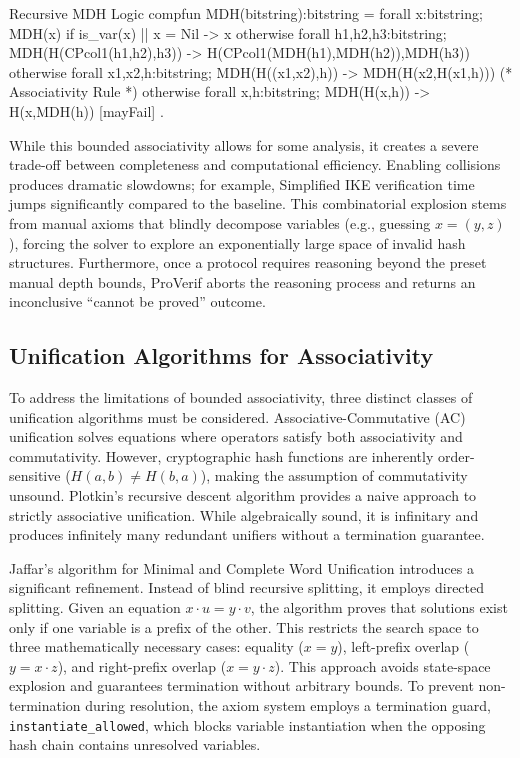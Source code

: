 \documentclass[journal]{IEEEtran}
\begin{document}
\begin{proverifcode}{Recursive MDH Logic}
compfun MDH(bitstring):bitstring =
  forall x:bitstring; MDH(x) if is_var(x) || x = Nil -> x
  otherwise forall h1,h2,h3:bitstring; 
    MDH(H(CPcol1(h1,h2),h3)) -> H(CPcol1(MDH(h1),MDH(h2)),MDH(h3))
  otherwise forall x1,x2,h:bitstring; 
    MDH(H((x1,x2),h)) -> MDH(H(x2,H(x1,h))) (* Associativity Rule *)
  otherwise forall x,h:bitstring; 
    MDH(H(x,h)) -> H(x,MDH(h))
  [mayFail]
.
\end{proverifcode}

While this bounded associativity allows for some analysis, it creates a severe trade-off between completeness and computational efficiency. Enabling collisions produces dramatic slowdowns; for example, Simplified IKE verification time jumps significantly compared to the baseline. This combinatorial explosion stems from manual axioms that blindly decompose variables (e.g., guessing $x = (y,z)$), forcing the solver to explore an exponentially large space of invalid hash structures. Furthermore, once a protocol requires reasoning beyond the preset manual depth bounds, ProVerif aborts the reasoning process and returns an inconclusive ``cannot be proved'' outcome.

\subsection{Unification Algorithms for Associativity}
To address the limitations of bounded associativity, three distinct classes of unification algorithms must be considered. Associative-Commutative (AC) unification solves equations where operators satisfy both associativity and commutativity. However, cryptographic hash functions are inherently order-sensitive ($H(a,b) \neq H(b,a)$), making the assumption of commutativity unsound. Plotkin's recursive descent algorithm provides a naive approach to strictly associative unification. While algebraically sound, it is infinitary and produces infinitely many redundant unifiers without a termination guarantee.

Jaffar's algorithm for Minimal and Complete Word Unification \cite{jaffar1990word} introduces a significant refinement. Instead of blind recursive splitting, it employs directed splitting.  Given an equation $x \cdot u = y \cdot v$, the algorithm proves that solutions exist only if one variable is a prefix of the other. This restricts the search space to three mathematically necessary cases: equality ($x=y$), left-prefix overlap ($y = x \cdot z$), and right-prefix overlap ($x = y \cdot z$). This approach avoids state-space explosion and guarantees termination without arbitrary bounds. To prevent non-termination during resolution, the axiom system employs a termination guard, \texttt{instantiate\_allowed}, which blocks variable instantiation when the opposing hash chain contains unresolved variables.
\end{document}
